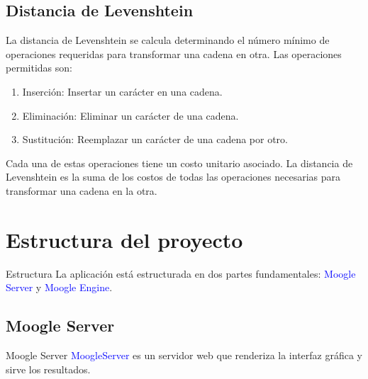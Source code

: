 \documentclass{beamer}
\begin{document}
\subsection{Distancia de Levenshtein}
\begin{frame}
La distancia de Levenshtein se calcula determinando el número mínimo de operaciones requeridas para transformar una cadena en otra. Las operaciones permitidas son:
\begin{enumerate}

\item Inserción: Insertar un carácter en una cadena.
\item Eliminación: Eliminar un carácter de una cadena.
\item Sustitución: Reemplazar un carácter de una cadena por otro.
\end{enumerate}
Cada una de estas operaciones tiene un costo unitario asociado. La distancia de Levenshtein es la suma de los costos de todas las operaciones necesarias para transformar una cadena en la otra.
\end{frame}

\section{Estructura del proyecto}
\begin{frame}{Estructura}
La aplicación está estructurada en dos partes fundamentales: \textcolor{blue}{Moogle Server} y \textcolor{blue}{Moogle Engine}.
\end{frame}
\subsection{Moogle Server}
\begin{frame}{Moogle Server}
  \textcolor{blue}{MoogleServer} es un servidor web que renderiza la interfaz gráfica y sirve los resultados.
\end{frame}
\end{document}
